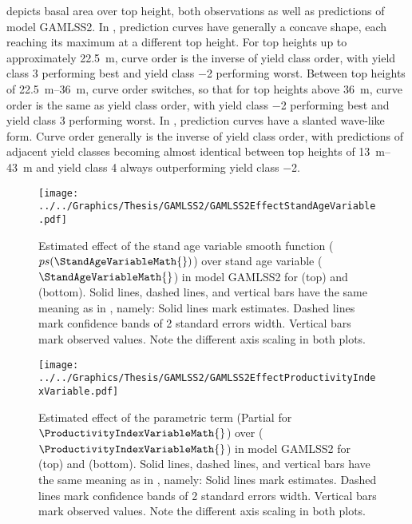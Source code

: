  depicts basal area over top height, both observations as well as predictions of model GAMLSS2.  In \Beech{}, prediction curves have generally a concave shape, each reaching its maximum at a different top height.  For top heights up to approximately \SI{22.5}{\meter}, curve order is the inverse of yield class order, with yield class \num{3} performing best and yield class \num{-2} performing worst.  Between top heights of \SIrange{22.5}{36}{\meter}, curve order switches, so that for top heights above \SI{36}{\meter}, curve order is the same as yield class order, with yield class \num{-2} performing best and yield class \num{3} performing worst.  In \Spruce{}, prediction curves have a slanted wave-like form.  Curve order generally is the inverse of yield class order, with predictions of adjacent yield classes becoming almost identical between top heights of \SIrange{13}{43}{\meter} and yield class \num{4} always outperforming yield class \num{-2}.

\begin{figure}[h]
  \centering
  \texttt{[image: ../../Graphics/Thesis/GAMLSS2/GAMLSS2EffectStandAgeVariable.pdf]}
  \caption{Estimated effect of the stand age variable smooth function (\(ps(\StandAgeVariableMath{})\)) over stand age variable (\(\StandAgeVariableMath{}\)) in model GAMLSS2 for \Beech{} (top) and \Spruce{} (bottom).  Solid lines, dashed lines, and vertical bars have the same meaning as in , namely:  Solid lines mark estimates.  Dashed lines mark confidence bands of 2 standard errors width.  Vertical bars mark observed values.  Note the different axis scaling in both plots.}
  \label{fig:GAMLSS2EffectStandAgeVariable}
\end{figure}

\begin{figure}[h]
  \centering
  \texttt{[image: ../../Graphics/Thesis/GAMLSS2/GAMLSS2EffectProductivityIndexVariable.pdf]}
  \caption{Estimated effect of the parametric \ProductivityIndexVariableText{} term (Partial for \(\ProductivityIndexVariableMath{}\)) over \ProductivityIndexVariableText{} (\(\ProductivityIndexVariableMath{}\)) in model GAMLSS2 for \Beech{} (top) and \Spruce{} (bottom).  Solid lines, dashed lines, and vertical bars have the same meaning as in , namely:  Solid lines mark estimates.  Dashed lines mark confidence bands of 2 standard errors width.  Vertical bars mark observed values.  Note the different axis scaling in both plots.}
  \label{fig:GAMLSS2EffectProductivityIndexVariable}
\end{figure}


